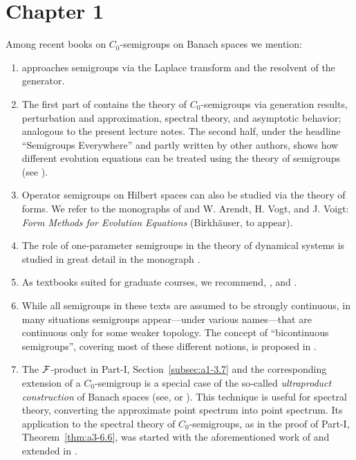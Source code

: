 \setcounter{section}{0}
\notesheaderone
\thispagestyle{empty}
\section*{Chapter 1}
Among recent books on $C_{0}$-semigroups on Banach spaces we mention:
\begin{enumerate}
\item 
\textcite{zbmath05842872} approaches semigroups via the Laplace transform and the resolvent of the generator. 

\item 
The first part of \textcite{zbmath01354832} contains the theory of $C_{0}$-semigroups via generation results, perturbation and approximation, spectral theory, and asymptotic behavior; analogous to the present lecture notes. 
The second half, under the headline \enquote{Semigroups Everywhere} and partly written by other authors, shows how different evolution equations can be treated using the theory of semigroups (see \textcite[Chap. VI]{zbmath01354832}).

\item 
Operator semigroups on Hilbert spaces can also be studied via the theory of forms.
We refer to the monographs of \textcite{zbmath02168554} and W. Arendt, H. Vogt, and J. Voigt: \emph{Form Methods for Evolution Equations} (Birkhäuser, to appear).

\item
The role of one-parameter semigroups in the theory of dynamical systems is studied in great detail in the monograph \textcite{zbmath01329917}.

\item
As textbooks suited for graduate courses, we recommend, \eg 
\textcite{zbmath07066876}, \textcite{zbmath05051510} and
\textcite{zbmath06706234}.

\item
While all semigroups in these texts are assumed to be strongly continuous, in many situations semigroups appear---under various names---that are continuous only for some weaker topology. 
The concept of \enquote{bicontinuous semigroups}, covering most of these different notions, is proposed in \textcite{zbmath02051541}. 
\item
The $\mathcal{F}$-product in Part-I, Section~\ref{subsec:a1-3.7} and the corresponding extension of a $C_{0}$-semigroup is a special case of the so-called \emph{ultraproduct construction} of Banach spaces (see, \eg \textcite{zbmath03640303} or \textcite{zbmath03987965}).
This technique is useful for spectral theory, converting the approximate point spectrum into point spectrum. 
Its application to the spectral theory of $C_{0}$-semigroups, as in 
the proof of Part-I, Theorem~\ref{thm:a3-6.6}, was started with the aforementioned work of \textcite{derndingerEN:1980} and extended in \textcite{zbmath069217}.


\end{enumerate}

